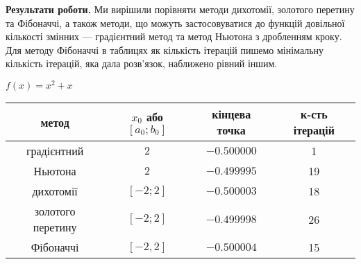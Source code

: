 \documentclass{extreport}
\begin{document}
\noindent\textbf{Результати роботи.}
Ми вирішили порівняти методи дихотомії, золотого перетину та Фібоначчі, а також методи, що можуть застосовуватися до функцій довільної
кількості змінних --- градієнтний метод та метод Ньютона з дробленням кроку.
Для методу Фібоначчі в таблицях як кількість ітерацій пишемо мінімальну кількість ітерацій, яка дала розв'язок, наближено рівний іншим.
\begin{center}
    $f(x) = x^2 + x$


    \begin{tabular}{|c|c|c|c|}
    \hline
                    \bf метод & $x_0$ або $[a_0; b_0]$ &  \bf кінцева точка &  \bf к-сть ітерацій \\
                    \hline
              градієнтний &                    $2$ &    $-0.500000$ &                   1 \\
              \hline
                  Ньютона &                    $2$ &    $-0.499995$ &                  19 \\
                  \hline
                дихотомії &              $[-2; 2]$ &    $-0.500003$ &                  18 \\
                \hline
        золотого перетину &              $[-2; 2]$ &    $-0.499998$ &                  26 \\
        \hline
                Фібоначчі &              $[-2, 2]$ &    $-0.500004$ &                  15 \\
                \hline
    \end{tabular}
\end{center}
\end{document}
